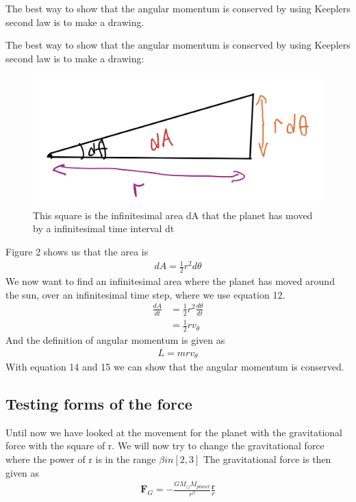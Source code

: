 \documentclass{article}
\begin{document}
\begin{multicols}{2}
The best way to show that the angular momentum is conserved by using Keeplers second law is to make a drawing.


The best way to show that the angular momentum is conserved by using Keeplers second law is to make a drawing:

\begin{figure}[H]
	\centering
	\includegraphics[width=\linewidth]{sketch.jpg}
	\caption{This square is the infinitesimal area dA that the planet has moved by a infinitesimal time interval dt}
	\label{fig:1bplot}
\end{figure}
Figure 2 shows us that the area is 
\begin{align}
    dA=\frac{1}{2}r^2d\theta
\end{align}
We now want to find an infinitesimal area where the planet has moved around the sun, over an infinitesimal time step, where we use equation 12.
\begin{align}
    \frac{dA}{dt}&=\frac{1}2{r^2}\frac{d\theta}{dt}\\
    &=\frac{1}{2}rv_\theta
\end{align}
And the definition of angular momentum is given as
\begin{align}
    L=mrv_\theta
\end{align}
With equation 14 and 15 we can show that the angular momentum is conserved.
\subsection{Testing forms of the force}
Until now we have looked at the movement for the planet with the gravitational force with the square of r. We will now try to change the gravitational force where the power of r is in the range $\beta in [2,3]$ The gravitational force is then given as
\begin{align}
    \mathbf{F}_G=-\frac{GM_{\odot}M_{planet}}{r^{\beta}}\frac{\mathbf{r}}{r}
\end{align}

\end{multicols}
\end{document}

